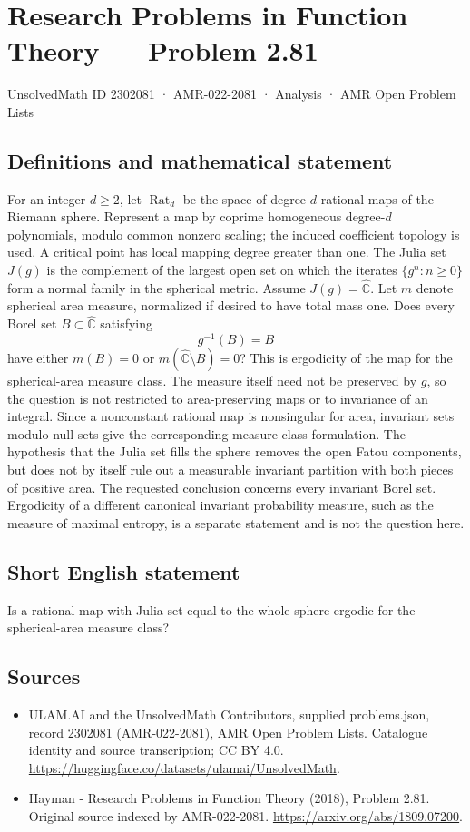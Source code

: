\documentclass[11pt,a4paper]{article}
\begin{document}
\section*{Research Problems in Function Theory — Problem 2.81}\label{2302081}
{\small UnsolvedMath ID 2302081 · AMR-022-2081 · Analysis · AMR Open Problem Lists}
\subsection{Definitions and mathematical statement}
For an integer $d\ge2$, let $\operatorname{Rat}_d$ be the space of degree-$d$ rational maps of the Riemann sphere. Represent a map by coprime homogeneous degree-$d$ polynomials, modulo common nonzero scaling; the induced coefficient topology is used. A critical point has local mapping degree greater than one. The Julia set $J(g)$ is the complement of the largest open set on which the iterates $\{g^n:n\ge0\}$ form a normal family in the spherical metric.
Assume $J(g)=\widehat{\mathbb C}$. Let $m$ denote spherical area measure, normalized if desired to have total mass one. Does every Borel set $B\subset\widehat{\mathbb C}$ satisfying
\[
g^{-1}(B)=B
\]
have either $m(B)=0$ or $m(\widehat{\mathbb C}\setminus B)=0$?
This is ergodicity of the map for the spherical-area measure class. The measure itself need not be preserved by $g$, so the question is not restricted to area-preserving maps or to invariance of an integral. Since a nonconstant rational map is nonsingular for area, invariant sets modulo null sets give the corresponding measure-class formulation.
The hypothesis that the Julia set fills the sphere removes the open Fatou components, but does not by itself rule out a measurable invariant partition with both pieces of positive area. The requested conclusion concerns every invariant Borel set. Ergodicity of a different canonical invariant probability measure, such as the measure of maximal entropy, is a separate statement and is not the question here.
\subsection{Short English statement}
Is a rational map with Julia set equal to the whole sphere ergodic for the spherical-area measure class?
\subsection{Sources}
\begin{itemize}
\item[S1] ULAM.AI and the UnsolvedMath Contributors, supplied problems.json, record 2302081 (AMR-022-2081), AMR Open Problem Lists. Catalogue identity and source transcription; CC BY 4.0.
\url{https://huggingface.co/datasets/ulamai/UnsolvedMath}.
\item[S2] Hayman - Research Problems in Function Theory (2018), Problem 2.81. Original source indexed by AMR-022-2081.
\url{https://arxiv.org/abs/1809.07200}.
\end{itemize}
\end{document}
